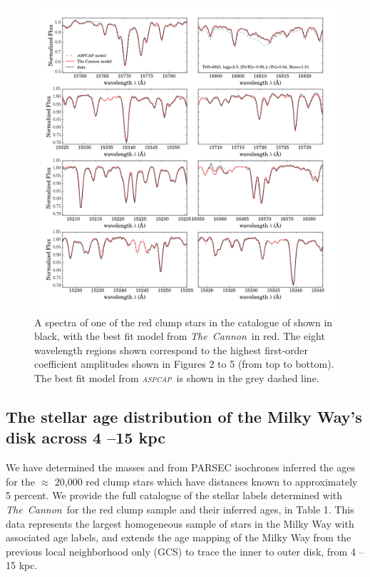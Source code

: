 \documentclass[12pt, preprint]{aastex}
\newcommand{\project}[1]{\textsl{#1}}
\newcommand{\tc}{\project{The~Cannon}}
\newcommand{\aspcap}{\project{\textsc{aspcap}}}
\begin{document}
\begin{figure}[p]
\centering
      \includegraphics[scale=0.5]{./plots/spectra_fits_7.png}
  \caption{A spectra of one of the red clump stars in the catalogue of \citet{Bovy2014} shown in black, with the best fit model from \tc\ in red. The eight wavelength regions shown correspond to the highest first-order coefficient amplitudes shown in Figures 2 to 5 (from top to bottom). The best fit model from \aspcap\ is shown in the grey dashed line.}
\label{fig:spectra}
\end{figure}



\subsection{The stellar age distribution of the Milky Way's disk across 4 --15 kpc}

We have determined the masses and from PARSEC isochrones inferred the ages for the $\approx$ 20,000 red clump stars which have distances known to approximately 5 percent. We provide the full catalogue of the stellar labels determined with \tc\ for the red clump sample and their inferred ages, in Table 1. This data represents the largest homogeneous sample of stars in the Milky Way with associated age labels, and extends the age mapping of the Milky Way from the previous local neighborhood only (GCS) to trace the inner to outer disk, from 4 -- 15 kpc.  
\end{document}
